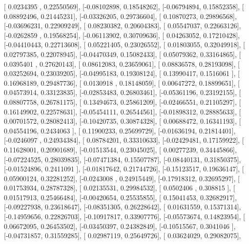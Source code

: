 \documentclass{article}
\begin{document}
       [ 0.0234395 ,  0.22550569],
       [-0.08102898,  0.18548262],
       [-0.06794894,  0.15852358],
       [ 0.08892496,  0.21445231],
       [-0.03326205,  0.29736604],
       [ 0.10870273,  0.29896568],
       [-0.03696231,  0.22909249],
       [ 0.08230382,  0.20604383],
       [ 0.05547037,  0.22663126],
       [-0.0262859 ,  0.19568254],
       [-0.06113902,  0.30709636],
       [ 0.04263052,  0.17210428],
       [-0.04410443,  0.22713608],
       [ 0.05221405,  0.23026552],
       [ 0.01803055,  0.32049918],
       [ 0.02797385,  0.22078945],
       [-0.04470349,  0.15082433],
       [ 0.05079362,  0.33164865],
       [ 0.0395401 ,  0.27620143],
       [ 0.08612083,  0.23659061],
       [ 0.08836578,  0.28193098],
       [ 0.03252694,  0.23039205],
       [-0.04995183,  0.19308124],
       [ 0.13990417,  0.1516061 ],
       [ 0.16968189,  0.29487736],
       [ 0.0130918 ,  0.18148059],
       [ 0.00647272,  0.18899651],
       [ 0.04573914,  0.33123835],
       [-0.02853483,  0.26803461],
       [-0.05361196,  0.23192155],
       [ 0.08807758,  0.26781175],
       [ 0.13494673,  0.25861209],
       [-0.02466551,  0.21105297],
       [ 0.16149902,  0.22578631],
       [-0.05454111,  0.26544561],
       [-0.01898312,  0.28885633],
       [ 0.00701572,  0.28082413],
       [-0.10420735,  0.30874328],
       [ 0.00688472,  0.16341193],
       [ 0.04554196,  0.2434063 ],
       [ 0.11900233,  0.25699729],
       [-0.01636194,  0.21814401],
       [-0.0246097 ,  0.24934384],
       [ 0.08784201,  0.33310633],
       [-0.02429481,  0.17159922],
       [ 0.11628001,  0.20901689],
       [-0.01513544,  0.23045025],
       [ 0.00277239,  0.34445866],
       [-0.07224525,  0.28039835],
       [-0.07471384,  0.15507787],
       [-0.08440131,  0.31850375],
       [-0.01524896,  0.2411091 ],
       [-0.01817642,  0.21744726],
       [-0.15123517,  0.19636147],
       [ 0.05900124,  0.32281252],
       [-0.0243008 ,  0.24915449],
       [-0.17918312,  0.32695297],
       [ 0.01753934,  0.28787328],
       [ 0.02135531,  0.29984532],
       [ 0.0502406 ,  0.308815  ],
       [ 0.01517913,  0.25466484],
       [-0.00420654,  0.25535855],
       [ 0.15041453,  0.32682917],
       [-0.09227938,  0.23618647],
       [-0.08351305,  0.26228642],
       [ 0.01631559,  0.15371314],
       [-0.14959656,  0.22826703],
       [-0.10917817,  0.33907776],
       [-0.05573674,  0.14823954],
       [ 0.06672095,  0.26453502],
       [-0.03450397,  0.24382849],
       [-0.10515567,  0.3041046 ],
       [-0.04731857,  0.31559285],
       [ 0.02987119,  0.25649726],
       [ 0.03624029,  0.29082075],
\end{document}
